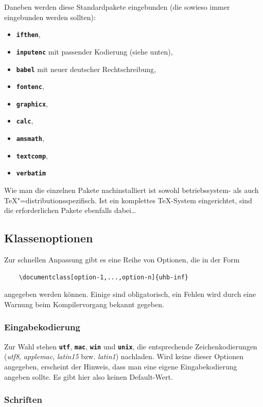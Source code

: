 \documentclass[palatino,gruppe-aus,semester-aus,veranstaltung-aus,abgabe-aus,tutor-aus,utf]{uhb-inf}
\def\option#1{\texttt{\bfseries #1}}
\begin{document}
Daneben werden diese Standardpakete eingebunden (die sowieso immer eingebunden werden sollten):

\begin{itemize}[noitemsep]
	\item \option{ifthen},
	\item \option{inputenc} mit passender Kodierung (siehe unten),
	\item \option{babel} mit neuer deutscher Rechtschreibung,
	\item \option{fontenc},
	\item \option{graphicx},
	\item \option{calc},
	\item \option{amsmath},
	\item \option{textcomp},
	\item \option{verbatim}
\end{itemize}

Wie man die einzelnen Pakete nachinstalliert ist sowohl betriebssystem- als auch \TeX"=distributionsspezifisch. Ist ein komplettes \TeX-System eingerichtet, sind die erforderlichen Pakete ebenfalls dabei\dots

\subsection{Klassenoptionen}

Zur schnellen Anpassung gibt es eine Reihe von Optionen, die in der Form

\begin{verbatim}
    \documentclass[option-1,...,option-n]{uhb-inf}
\end{verbatim}

angegeben werden können. Einige sind obligatorisch, ein Fehlen wird durch eine Warnung beim Kompilervorgang bekannt gegeben.

\subsubsection{Eingabekodierung}

Zur Wahl stehen \option{utf}, \option{mac}, \option{win} und \option{unix}, die entsprechende Zeichenkodierungen (\textit{utf8}, \textit{applemac}, \textit{latin15} bzw. \textit{latin1}) nachladen. Wird keine dieser Optionen angegeben, erscheint der Hinweis, dass man eine eigene Eingabekodierung angeben sollte. Es gibt hier also keinen Default-Wert.

\subsubsection{Schriften}
\end{document}
